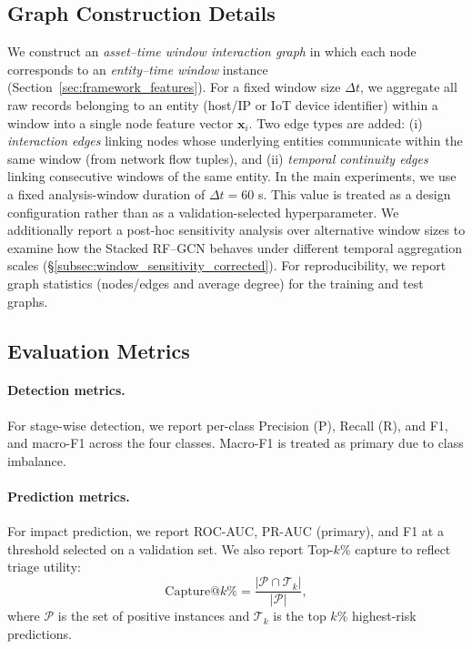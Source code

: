 \documentclass[pdflatex,sn-mathphys-num]{sn-jnl}
\theoremstyle{thmstyleone}%
\theoremstyle{thmstyletwo}%
\theoremstyle{thmstylethree}%
\begin{document}
\subsection{Graph Construction Details}
\label{subsec:graph_details}
We construct an \emph{asset--time window interaction graph} in which each node corresponds to an \emph{entity--time window} instance (Section~\ref{sec:framework_features}). For a fixed window size $\Delta t$, we aggregate all raw records belonging to an entity (host/IP or IoT device identifier) within a window into a single node feature vector $\mathbf{x}_i$. Two edge types are added: (i) \emph{interaction edges} linking nodes whose underlying entities communicate within the same window (from network flow tuples), and (ii) \emph{temporal continuity edges} linking consecutive windows of the same entity. In the main experiments, we use a fixed analysis-window duration of $\Delta t=60$ s. This value is treated as a design configuration rather than as a validation-selected hyperparameter. We additionally report a post-hoc sensitivity analysis over alternative window sizes to examine how the Stacked RF--GCN behaves under different temporal aggregation scales (\S\ref{subsec:window_sensitivity_corrected}). For reproducibility, we report graph statistics (nodes/edges and average degree) for the training and test graphs.


\subsection{Evaluation Metrics}
\label{subsec:metrics}

\paragraph{Detection metrics.}
For stage-wise detection, we report per-class Precision (P), Recall (R), and F1, and macro-F1 across the four classes. Macro-F1 is treated as primary due to class imbalance.

\paragraph{Prediction metrics.}
For impact prediction, we report ROC-AUC, PR-AUC (primary), and F1 at a threshold selected on a validation set. We also report Top-$k\%$ capture to reflect triage utility:
\begin{equation}
\mathrm{Capture}@k\%=\frac{|\mathcal{P}\cap \mathcal{T}_k|}{|\mathcal{P}|},
\end{equation}
where $\mathcal{P}$ is the set of positive instances and $\mathcal{T}_k$ is the top $k\%$ highest-risk predictions.
\end{document}
